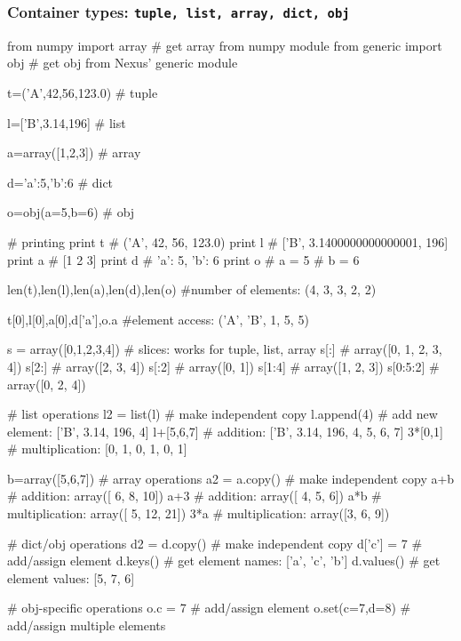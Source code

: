 \subsubsection{Container types: \texttt{tuple, list, array, dict, obj}}
\begin{shade}
from numpy import array  # get array from numpy module
from generic import obj  # get obj from Nexus' generic module 

t=('A',42,56,123.0)     # tuple

l=['B',3.14,196]        # list

a=array([1,2,3])        # array

d={'a':5,'b':6}         # dict

o=obj(a=5,b=6)          # obj

                        # printing
print t                 #  ('A', 42, 56, 123.0)
print l                 #  ['B', 3.1400000000000001, 196]
print a                 #  [1 2 3]
print d                 #  {'a': 5, 'b': 6}
print o                 #    a               = 5
                        #    b               = 6

len(t),len(l),len(a),len(d),len(o) #number of elements: (4, 3, 3, 2, 2)

t[0],l[0],a[0],d['a'],o.a  #element access: ('A', 'B', 1, 5, 5)

s = array([0,1,2,3,4])  # slices: works for tuple, list, array
s[:]                    #   array([0, 1, 2, 3, 4])
s[2:]                   #   array([2, 3, 4])
s[:2]                   #   array([0, 1])
s[1:4]                  #   array([1, 2, 3])
s[0:5:2]                #   array([0, 2, 4])

                        # list operations
l2 = list(l)            #   make independent copy
l.append(4)             #   add new element: ['B', 3.14, 196, 4]
l+[5,6,7]               #   addition: ['B', 3.14, 196, 4, 5, 6, 7]
3*[0,1]                 #   multiplication:  [0, 1, 0, 1, 0, 1]

b=array([5,6,7])        # array operations
a2 = a.copy()           #   make independent copy
a+b                     #   addition: array([ 6, 8, 10])
a+3                     #   addition: array([ 4, 5, 6])
a*b                     #   multiplication: array([ 5, 12, 21])
3*a                     #   multiplication: array([3, 6, 9])

                        # dict/obj operations
d2 = d.copy()           #   make independent copy
d['c'] = 7              #   add/assign element 
d.keys()                #   get element names: ['a', 'c', 'b']
d.values()              #   get element values: [5, 7, 6]

                        # obj-specific operations
o.c = 7                 #   add/assign element
o.set(c=7,d=8)          #   add/assign multiple elements

\end{shade}
